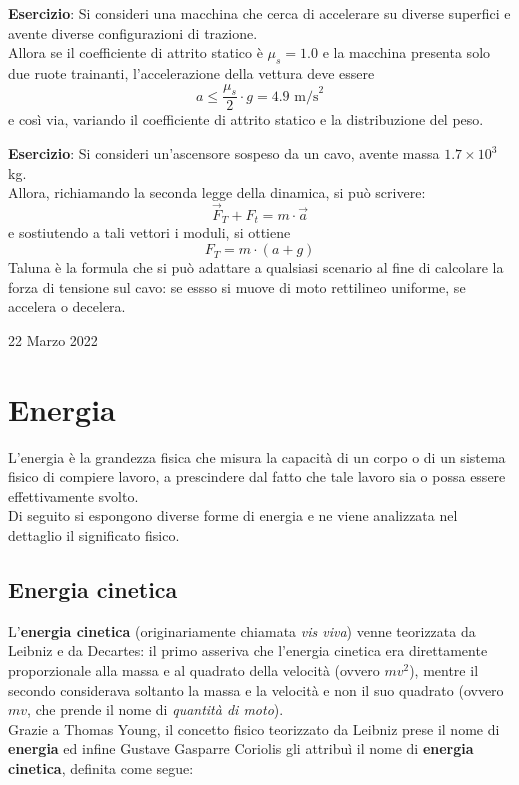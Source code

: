 \documentclass[a4paper]{extarticle}
\begin{document}
\vspace{1em}
\noindent
\textbf{Esercizio}: Si consideri una macchina che cerca di accelerare su diverse superfici e avente diverse configurazioni di trazione.\\
Allora se il coefficiente di attrito statico è $\mu_s=1.0$ e la macchina presenta solo due ruote trainanti, l'accelerazione della vettura deve essere
\[a \leq \frac{\mu_s}{2} \cdot g = 4.9 \text{ m/s}^2\]
e così via, variando il coefficiente di attrito statico e la distribuzione del peso.

\vspace{1em}
\noindent
\textbf{Esercizio}: Si consideri un'ascensore sospeso da un cavo, avente massa $1.7 \times 10^3$ kg.\\
Allora, richiamando la seconda legge della dinamica, si può scrivere:
\[\vec F_T + F_t = m \cdot \vec a\]
e sostiutendo a tali vettori i moduli, si ottiene
\[F_T = m \cdot (a + g)\]
Taluna è la formula che si può adattare a qualsiasi scenario al fine di calcolare la forza di tensione sul cavo: se essso si muove di moto rettilineo uniforme, se accelera o decelera.

\newpage
\noindent
\begin{center}
  22 Marzo 2022
\end{center}
\section{Energia}
L'energia è la grandezza fisica che misura la capacità di un corpo o di un sistema fisico di compiere lavoro, a prescindere dal fatto che tale lavoro sia o possa essere effettivamente svolto.\\
Di seguito si espongono diverse forme di energia e ne viene analizzata nel dettaglio il significato fisico.

\vspace{1em}
\subsection{Energia cinetica}
L'\textbf{energia cinetica} (originariamente chiamata \emph{vis viva}) venne teorizzata da Leibniz e da Decartes: il primo asseriva che l'energia cinetica era direttamente proporzionale alla massa e al quadrato della velocità (ovvero $m v^2$), mentre il secondo considerava soltanto la massa e la velocità e non il suo quadrato (ovvero $m v$, che prende il nome di \emph{quantità di moto}).\\
Grazie a Thomas Young, il concetto fisico teorizzato da Leibniz prese il nome di \textbf{energia} ed infine Gustave Gasparre Coriolis gli attribuì il nome di \textbf{energia cinetica}, definita come segue:
\end{document}

